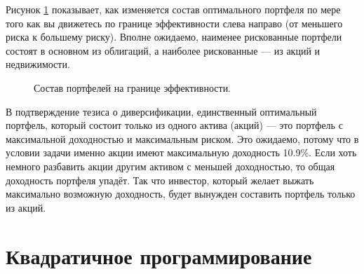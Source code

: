 Рисунок \ref{efficient_frontier_allocation} показывает, как изменяется состав оптимального портфеля по мере того как вы движетесь по границе эффективности слева направо (от меньшего риска к большему риску). Вполне ожидаемо, наименее рискованные портфели состоят в основном из облигаций, а наиболее рискованные --- из акций и недвижимости.

\begin{figure}[h!]
\centering
{}

\caption{Состав портфелей на границе эффективности.}
\label{efficient_frontier_allocation}
\end{figure}

В подтверждение тезиса о диверсификации, единственный оптимальный портфель, который состоит только из одного актива (акций) --- это портфель с максимальной доходностью и максимальным риском. Это ожидаемо, потому что в условии задачи именно акции имеют максимальную доходность 10.9\%. Если хоть немного разбавить акции другим активом с меньшей доходностью, то общая доходность портфеля упадёт. Так что инвестор, который желает выжать максимально возможную доходность, будет вынужден составить портфель только из акций.

\section*{Квадратичное программирование}

